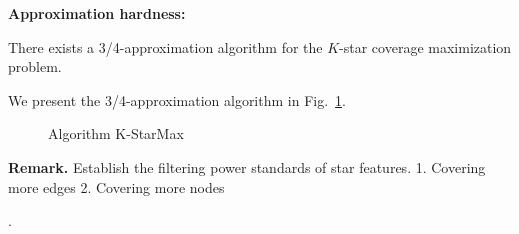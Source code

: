 \textbf{Approximation hardness:}

\begin{theorem}
\label{thm-star-mini-complexity}
There exists a 3/4-approximation algorithm for the $K$-star coverage maximization problem.
\end{theorem}

We present the 3/4-approximation algorithm in Fig.~\ref{k-star-max-alg}.

\begin{figure}[tb!]
\vspace{2ex}
\begin{center}
{\small

\myhrule \vspace{-2ex}
\vspace{-2.5ex} \myhrule
}
\end{center}
\vspace{-4ex}
\caption{Algorithm K-StarMax} \label{k-star-max-alg}
\vspace{-3ex}
\end{figure}

\textcolor[rgb]{1.00,0.00,0.00}{\textbf{Remark.}
Establish the filtering power standards of star features.
1. Covering more edges
2. Covering more nodes}

.


